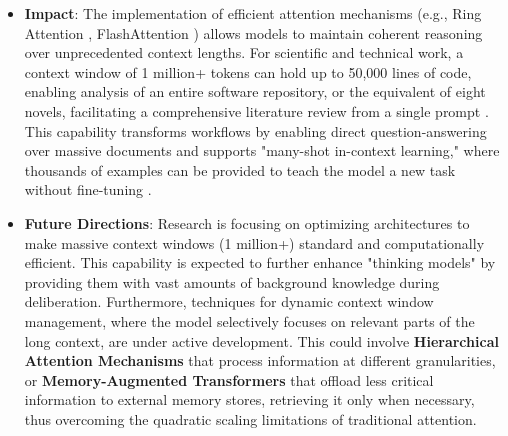 \documentclass{article}
\begin{document}
\begin{itemize}
    \item \textbf{Impact}: The implementation of efficient attention mechanisms (e.g., Ring Attention \cite{liu2023ring}, FlashAttention \cite{dao2022flashattention}) allows models to maintain coherent reasoning over unprecedented context lengths. For scientific and technical work, a context window of 1 million+ tokens can hold up to 50,000 lines of code, enabling analysis of an entire software repository, or the equivalent of eight novels, facilitating a comprehensive literature review from a single prompt \cite{reid2024gemini}. This capability transforms workflows by enabling direct question-answering over massive documents and supports "many-shot in-context learning," where thousands of examples can be provided to teach the model a new task without fine-tuning \cite{reid2024gemini}.
    \item \textbf{Future Directions}: Research is focusing on optimizing architectures to make massive context windows (1 million+) standard and computationally efficient. This capability is expected to further enhance "thinking models" by providing them with vast amounts of background knowledge during deliberation. Furthermore, techniques for dynamic context window management, where the model selectively focuses on relevant parts of the long context, are under active development. This could involve \textbf{Hierarchical Attention Mechanisms} that process information at different granularities, or \textbf{Memory-Augmented Transformers} that offload less critical information to external memory stores, retrieving it only when necessary, thus overcoming the quadratic scaling limitations of traditional attention.
\end{itemize}
\end{document}
